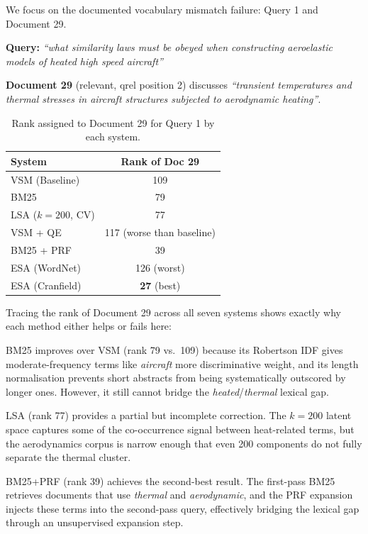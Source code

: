 \documentclass{svproc}
\begin{document}
    We focus on the documented vocabulary mismatch failure: Query 1 and Document 29.

    \textbf{Query:} \textit{``what similarity laws must be obeyed when constructing aeroelastic models of heated high speed aircraft''}

    \textbf{Document 29} (relevant, qrel position 2) discusses \textit{``transient temperatures and thermal stresses in aircraft structures subjected to aerodynamic heating''}.

    \begin{table}[H]
    \centering
    \renewcommand{\arraystretch}{1.2}
    \begin{tabular}{lc}
    \toprule
    \textbf{System} & \textbf{Rank of Doc 29} \\
    \midrule
    VSM (Baseline) & 109 \\
    BM25           & 79  \\
    LSA ($k{=}200$, CV) & 77  \\
    VSM + QE       & 117 (worse than baseline) \\
    BM25 + PRF     & 39  \\
    ESA (WordNet)  & 126 (worst) \\
    ESA (Cranfield)& \textbf{27} (best) \\
    \bottomrule
    \end{tabular}
    \caption{Rank assigned to Document 29 for Query 1 by each system.}
    \end{table}

    Tracing the rank of Document 29 across all seven systems shows exactly why each method either helps or fails here:

    BM25 improves over VSM (rank 79 vs.\ 109) because its Robertson IDF gives moderate-frequency terms like \textit{aircraft} more discriminative weight, and its length normalisation prevents short abstracts from being systematically outscored by longer ones. However, it still cannot bridge the \textit{heated}/\textit{thermal} lexical gap.

    LSA (rank 77) provides a partial but incomplete correction. The $k{=}200$ latent space captures some of the co-occurrence signal between heat-related terms, but the aerodynamics corpus is narrow enough that even 200 components do not fully separate the thermal cluster.

    BM25+PRF (rank 39) achieves the second-best result. The first-pass BM25 retrieves documents that use \textit{thermal} and \textit{aerodynamic}, and the PRF expansion injects these terms into the second-pass query, effectively bridging the lexical gap through an unsupervised expansion step.
\end{document}
